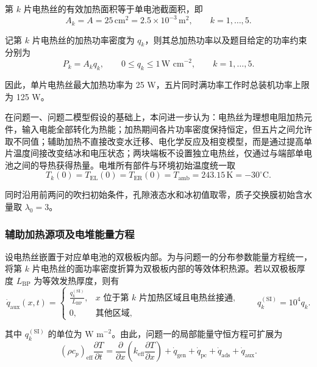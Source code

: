 \documentclass[bwprint]{gmcmthesis}
\numberwithin{equation}{section}
\numberwithin{figure}{section}
\begin{document}
 第 \(k\) 片电热丝的有效加热面积等于单电池截面积，即
\begin{equation}
A_k = A = 25 \, \text{cm}^2 = 2.5 \times 10^{-3} \, \text{m}^2, \qquad k = 1, \dots, 5. \label{eq:src:6-1}
\end{equation}

 记第 \(k\) 片电热丝的加热功率密度为 \(q_k\)，则其总加热功率以及题目给定的功率约束分别为
\begin{equation}
P_k = A_k q_k, \qquad 0 \leq q_k \leq 1 \, \text{W cm}^{-2}, \qquad k = 1, \dots, 5. \label{eq:src:6-2}
\end{equation}

 因此，单片电热丝最大加热功率为 25 W，五片同时满功率工作时总装机功率上限为 125 W。

 在问题一、问题二模型假设的基础上，本问进一步认为：电热丝为理想电阻加热元件，输入电能全部转化为热能；加热期间各片功率密度保持恒定，但五片之间允许取不同值；辅助加热不直接改变水迁移、电化学反应及相变模型，而是通过提高单片温度间接改变结冰和电压状态；两块端板不设置独立电热丝，仅通过与端部单电池之间的导热获得热量。电堆所有部件与环境初始温度统一取
\begin{equation}
T_k(0) = T_{\text{EL}}(0) = T_{\text{ER}}(0) = T_{\text{amb}} = 243.15 \, \text{K} = -30^\circ\text{C}. \label{eq:src:6-3}
\end{equation}

 同时沿用前两问的吹扫初始条件，孔隙液态水和冰初值取零，质子交换膜初始含水量取 \(\lambda_0 = 3\)。

\subsubsection{辅助加热源项及电堆能量方程}

 设电热丝嵌置于对应单电池的双极板内部。为与问题一的分布参数能量方程统一，将第 \(k\) 片电热丝的面功率密度折算为双极板内部的等效体积热源。若以双极板厚度 \(L_{\text{BP}}\) 为等效发热厚度，则有
\begin{equation}
\dot{q}_{\text{aux}}(x,t) = \begin{cases}
\frac{q_k^{(\text{SI})}}{L_{\text{BP}}}, & x \text{ 位于第 } k \text{ 片加热区域且电热丝接通}, \\
0, & \text{其他区域},
\end{cases} \qquad q_k^{(\text{SI})} = 10^4 q_k. \label{eq:src:6-4}
\end{equation}

 其中 \(q_k^{(\text{SI})}\) 的单位为 \(\text{W m}^{-2}\)。由此，问题一的局部能量守恒方程可扩展为
\begin{equation}
(\rho c_p)_{\text{eff}} \frac{\partial T}{\partial t} = \frac{\partial}{\partial x} \left( k_{\text{eff}} \frac{\partial T}{\partial x} \right) + \dot{q}_{\text{gen}} + \dot{q}_{\text{pc}} + \dot{q}_{\text{ads}} + \dot{q}_{\text{aux}}. \label{eq:src:6-5}
\end{equation}
\end{document}
